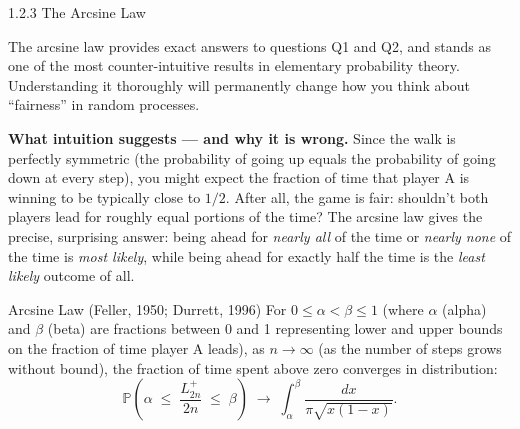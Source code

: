 \documentclass[aspectratio=169,10pt]{beamer}
\begin{document}
\begin{frame}[allowframebreaks]{1.2.3 The Arcsine Law}

  The arcsine law provides exact answers to questions Q1 and Q2, and stands
  as one of the most counter-intuitive results in elementary probability theory.
  Understanding it thoroughly will permanently change how you think about
  ``fairness'' in random processes.

  \textbf{What intuition suggests --- and why it is wrong.}  Since the walk is
  perfectly symmetric (the probability of going up equals the probability of
  going down at every step), you might expect the fraction of time that player
  A is winning to be typically close to $1/2$.  After all, the game is fair:
  shouldn't both players lead for roughly equal portions of the time?  The
  arcsine law gives the precise, surprising answer: being ahead for
  \emph{nearly all} of the time or \emph{nearly none} of the time is
  \emph{most likely}, while being ahead for exactly half the time is the
  \emph{least likely} outcome of all.

  \begin{block}{Arcsine Law (Feller, 1950; Durrett, 1996)}
    For $0 \le \alpha < \beta \le 1$ (where $\alpha$ (alpha) and $\beta$ (beta)
    are fractions between 0 and 1 representing lower and upper bounds on the
    fraction of time player A leads), as $n \to \infty$ (as the number of steps
    grows without bound), the fraction of time spent above zero converges in
    distribution:
    \[
      \mathbb{P}\!\left(
        \alpha \;\le\; \frac{L^+_{2n}}{2n} \;\le\; \beta
      \right)
      \;\longrightarrow\;
      \int_\alpha^\beta \frac{dx}{\pi \sqrt{x(1-x)}}.
      \tag{1.2.1}
    \]
  \end{block}


\end{frame}
\end{document}
